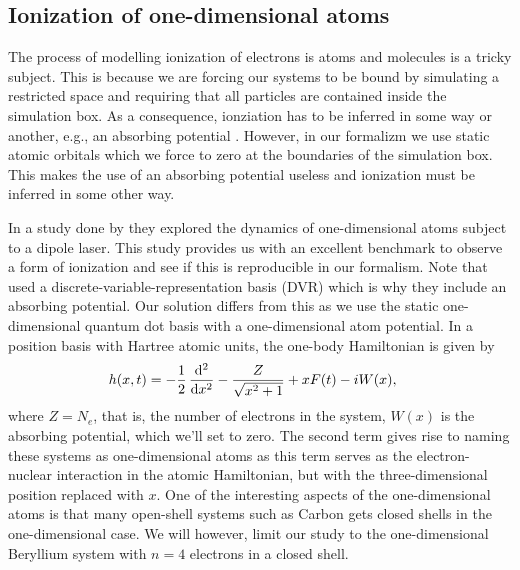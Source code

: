         \subsection{Ionization of one-dimensional atoms}
            The process of modelling ionization of electrons is atoms and
            molecules is a tricky subject.
            This is because we are forcing our systems to be bound by simulating
            a restricted space and requiring that all particles are contained
            inside the simulation box.
            As a consequence, ionziation has to be inferred in some way or
            another, e.g., an absorbing potential \cite{kosloff1986363,
            miyagi_and_madsen}.
            However, in our formalizm we use static atomic orbitals which we
            force to zero at the boundaries of the simulation box.
            This makes the use of an absorbing potential useless and ionization
            must be inferred in some other way.

            In a study done by \citeauthor{miyagi_and_madsen}
            \cite{miyagi_and_madsen} they explored the dynamics of
            one-dimensional atoms subject to a dipole laser.
            This study provides us with an excellent benchmark to observe a form
            of ionization and see if this is reproducible in our formalism.
            Note that \citeauthor{miyagi_and_madsen} used a
            discrete-variable-representation basis (DVR) which is why they
            include an absorbing potential.
            Our solution differs from this as we use the static one-dimensional
            quantum dot basis with a one-dimensional atom potential.
            In a position basis with Hartree atomic units, the one-body
            Hamiltonian is given by \cite{miyagi_and_madsen}
            \begin{align}
                \oneten(x, t)
                &= -\half \dod[2]{}{x}
                - \frac{Z}{\sqrt{x^2 + 1}}
                + xF(t)
                - iW(x),
            \end{align}
            where $Z = N_e$, that is, the number of electrons in the system,
            $W(x)$ is the absorbing potential, which we'll set to zero.
            The second term gives rise to naming these systems as
            one-dimensional atoms as this term serves as the electron-nuclear
            interaction in the atomic Hamiltonian, but with the
            three-dimensional position replaced with $x$.
            One of the interesting aspects of the one-dimensional atoms is that
            many open-shell systems such as Carbon gets closed shells in the
            one-dimensional case.
            We will however, limit our study to the one-dimensional Beryllium
            system with $n = 4$ electrons in a closed shell.

